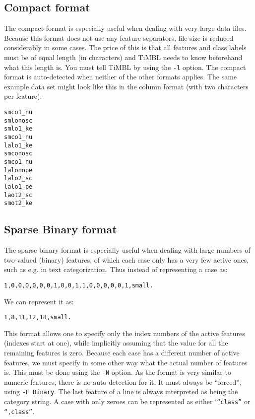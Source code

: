 \documentclass{report}
\begin{document}
\subsection{Compact format}
\label{compactformat}

The compact format is especially useful when dealing with very large
data files. Because this format does not use any feature separators,
file-size is reduced considerably in some cases. The price of this is
that all features and class labels must be of equal length (in
characters) and TiMBL needs to know beforehand what this length
is. You must tell TiMBL by using the {\tt -l} option. The compact
format is auto-detected when neither of the other formats applies. The
same example data set might look like this in the column format (with
two characters per feature):

\begin{footnotesize}
\begin{verbatim}
smco1_nu
smlonosc
smlo1_ke
smco1_nu
lalo1_ke
smconosc
smco1_nu
lalonope
lalo2_sc
lalo1_pe
laot2_sc
smot2_ke
\end{verbatim}
\end{footnotesize}

\subsection{Sparse Binary format}
\label{binaryformat}

The sparse binary format is especially useful when dealing with large
numbers of two-valued (binary) features, of which each case only has a
very few active ones, such as e.g. in text categorization. Thus
instead of representing a case as:

\begin{footnotesize}
\begin{verbatim}
1,0,0,0,0,0,0,1,0,0,1,1,0,0,0,0,0,1,small.
\end{verbatim}
\end{footnotesize}

We can represent it as:

\begin{footnotesize}
\begin{verbatim}
1,8,11,12,18,small.
\end{verbatim}
\end{footnotesize}

This format allows one to specify only the index numbers of the active
features (indexes start at one), while implicitly assuming that
the value for all the remaining features is zero. Because each case
has a different number of active features, we must specify in some
other way what the actual number of features is. This must be done
using the {\tt -N} option.  As the format is very similar to numeric
features, there is no auto-detection for it. It must always be
``forced'', using {\tt -F Binary}. The last feature of a line is
always interpreted as being the category string. A case with only
zeroes can be represented as either `{\tt ``class''} or {\tt ``,class''}.
\end{document}

